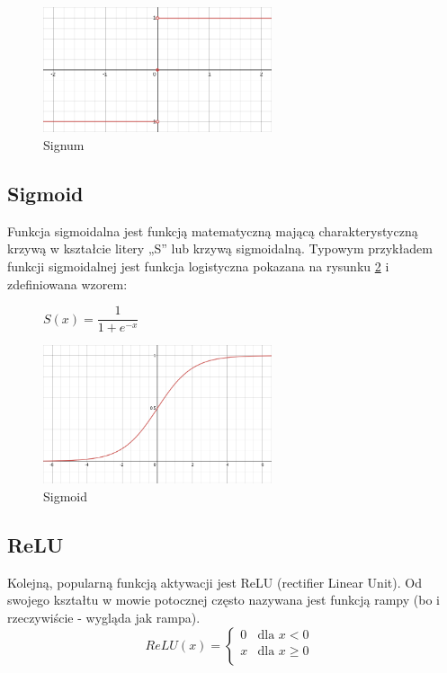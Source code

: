 \documentclass{article}
\begin{document}
\begin{figure}[H]
	\centering
	\includegraphics[width=0.6\textwidth,keepaspectratio=true]{Signum}
	\caption{
		Signum
	}
	\label{Signum}
\end{figure}


\subsection{Sigmoid}
Funkcja sigmoidalna jest funkcją matematyczną mającą charakterystyczną krzywą w kształcie litery „S” lub krzywą sigmoidalną.
Typowym przykładem funkcji sigmoidalnej jest funkcja logistyczna pokazana na rysunku \ref{Sigmoid} i zdefiniowana wzorem: 



\begin{figure}[H]
	\begin{center}
		$S(x) = \dfrac{1}{1 + e^{-x}}$
	\end{center}
	
	\centering
	\includegraphics[width=0.6\textwidth,keepaspectratio=true]{Sigmoid}
	\caption{
		Sigmoid
	}
	\label{Sigmoid}
\end{figure}

\subsection{ReLU}
Kolejną, popularną funkcją aktywacji jest ReLU (rectifier Linear Unit). Od swojego kształtu w mowie potocznej często nazywana jest funkcją rampy (bo i rzeczywiście - wygląda jak rampa).
\begin{equation}
	ReLU(x) = 
	\begin{cases}
		0 & \text{dla $x < 0$}\\
		x & \text{dla $x \geqslant 0$ }\\
	\end{cases}    
\end{equation}
\end{document}
